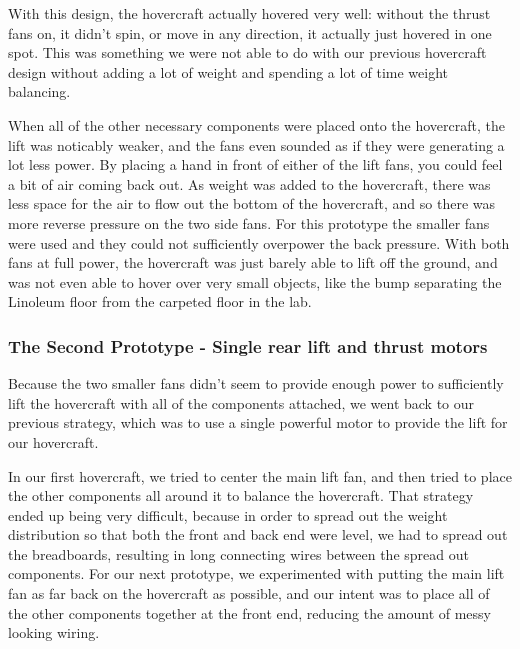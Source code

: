 With this design, the hovercraft actually hovered very well: without the thrust fans on, it didn't spin, or move in 
any direction, it actually just hovered in one spot. This was something we were not able to do with our previous hovercraft design 
without adding a lot of weight and spending a lot of time weight balancing.

When all of the other necessary components were placed onto the hovercraft, the lift was noticably weaker, and the fans
even sounded as if they were generating a lot less power. By placing a hand in front of either of the lift fans, you could feel
a bit of air coming back out. As weight was added to the hovercraft, there was less space for the air to flow out the bottom
of the hovercraft, and so there was more reverse pressure on the two side fans. For this prototype the smaller fans were used
and they could not sufficiently overpower the back pressure. With both fans at full power, the hovercraft was just barely able
to lift off the ground, and was not even able to hover over very small objects, like the bump separating the Linoleum floor
from the carpeted floor in the lab. 

\subsubsection{The Second Prototype - Single rear lift and thrust motors}
Because the two smaller fans didn't seem to provide enough power to sufficiently lift the hovercraft with all of the components
attached, we went back to our previous strategy, which was to use a single powerful motor to provide the lift for our hovercraft. 

In our first hovercraft, we tried to center the main lift fan, and then tried to place the other components all around it to 
balance the hovercraft. That strategy ended up being very difficult, because in order to spread out the weight distribution so that
both the front and back end were level, we had to spread out the breadboards, resulting in long connecting wires between the spread
out components. For our next prototype, we experimented with putting the main lift fan as far back on the hovercraft as possible,
and our intent was to place all of the other components together at the front end, reducing the amount of messy looking
wiring. 

